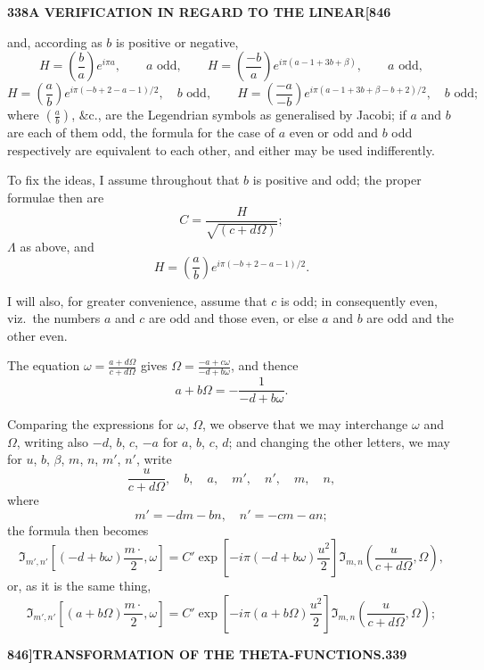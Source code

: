 \documentclass[12pt,a4paper]{article}
\theoremstyle{definition}
\begin{document}
\newpage
\setcounter{page}{338}

\noindent\textbf{338}\hfill\textbf{A VERIFICATION IN REGARD TO THE LINEAR}\hfill\textbf{[846}

\bigskip

\noindent and, according as $b$ is positive or negative,
\[
H = \left(\frac{b}{a}\right) e^{i\pi a}, \qquad a \text{ odd}, \qquad H = \left(\frac{-b}{a}\right) e^{i\pi(a-1+3b+\beta)}, \qquad a \text{ odd},
\]
\[
H = \left(\frac{a}{b}\right) e^{i\pi(-b+2-a-1)/2}, \quad b \text{ odd}, \quad\quad H = \left(\frac{-a}{-b}\right) e^{i\pi(a-1+3b+\beta-b+2)/2}, \quad b \text{ odd};
\]
where $\left(\frac{a}{b}\right)$, $\&\text{c.}$, are the Legendrian symbols as generalised by Jacobi; if $a$ and $b$ are each of them odd, the formula for the case of $a$ even or odd and $b$ odd respectively are equivalent to each other, and either may be used indifferently.

To fix the ideas, I assume throughout that $b$ is positive and odd; the proper formulae then are
\[
C = \frac{H}{\sqrt{(c + d\Omega)}};
\]
$\Lambda$ as above, and
\[
H = \left(\frac{a}{b}\right) e^{i\pi(-b+2-a-1)/2}.
\]

I will also, for greater convenience, assume that $c$ is odd; in consequently even, viz.\ the numbers $a$ and $c$ are odd and those even, or else $a$ and $b$ are odd and the other even.

The equation $\omega = \frac{a + d\Omega}{c + d\Omega}$ gives $\Omega = \frac{-a + c\omega}{-d + b\omega}$, and thence
\[
a + b\Omega = -\frac{1}{-d + b\omega}.
\]

Comparing the expressions for $\omega$, $\Omega$, we observe that we may interchange $\omega$ and $\Omega$, writing also $-d$, $b$, $c$, $-a$ for $a$, $b$, $c$, $d$; and changing the other letters, we may for $u$, $b$, $\beta$, $m$, $n$, $m'$, $n'$,
write
\[
\frac{u}{c + d\Omega}, \quad b, \quad a, \quad m', \quad n', \quad m, \quad n,
\]
where
\[
m' = -dm - bn, \quad n' = -cm - an;
\]
the formula then becomes
\[
\Im_{m',n'}\left[(-d + b\omega)\frac{m\cdot}{2}, \omega\right] = C' \exp\left[-i\pi(-d + b\omega)\frac{u^2}{2}\right] \Im_{m,n}\left(\frac{u}{c + d\Omega}, \Omega\right),
\]
or, as it is the same thing,
\[
\Im_{m',n'}\left[(a + b\Omega)\frac{m\cdot}{2}, \omega\right] = C' \exp\left[-i\pi(a + b\Omega)\frac{u^2}{2}\right] \Im_{m,n}\left(\frac{u}{c + d\Omega}, \Omega\right);
\]

\newpage
\setcounter{page}{339}

\noindent\textbf{846]}\hfill\textbf{TRANSFORMATION OF THE THETA-FUNCTIONS.}\hfill\textbf{339}
\end{document}
